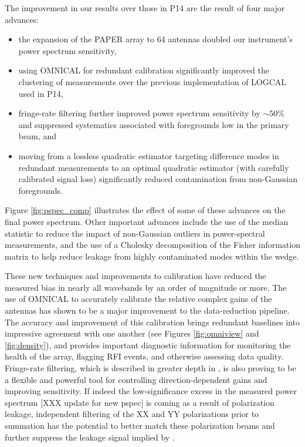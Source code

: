 \documentclass[twocolumn,numberedappendix]{emulateapj} \shorttitle{New Limits on the 21 cm Power Spectrum at $z=8.4$}
\begin{document}
The improvement in our results over those in P14 are the result of four
major advances:
\begin{itemize}
\item the expansion of the PAPER array to 64 antennas doubled our instrument's power spectrum sensitivity,
\item using OMNICAL for redundant calibration significantly improved the clustering of measurements
over the previous implementation of LOGCAL used in P14,
\item fringe-rate filtering further improved power spectrum sensitivity by $\sim$50\% and suppressed
systematics associated with foregrounds low in the primary beam, and
\item moving from a lossless quadratic estimator targeting difference modes
in redundant measurements to an optimal quadratic estimator (with carefully calibrated signal
loss) significantly reduced contamination from non-Gaussian foregrounds.
\end{itemize}
Figure \ref{fig:pspec_comp} illustrates the effect of some of these advances on the final
power spectrum.
Other important advances include the use of the median statistic to reduce the impact
of non-Gaussian outliers in power-spectral measurements, and the use of a Cholesky
decomposition of the Fisher information matrix to help reduce leakage 
from highly contaminated modes within the wedge.

These new techniques and improvements to calibration have reduced the measured
bias in nearly all wavebands by an order of magnitude or more. 
The use of
OMNICAL to accurately calibrate the relative complex gains of the antennas has
shown to be a major improvement to the data-reduction pipeline. The accuracy and improvement of
this calibration brings redundant baselines into impressive agreement with one another
(see Figures \ref{fig:omniview} and \ref{fig:density}),
and provides important diagnostic information for
monitoring the health of the
array, flagging RFI events, and otherwise assessing data quality.
Fringe-rate filtering, which is described in greater depth in \citep{parsons_et_al2015}, is also
proving to be a flexible and powerful tool for controlling direction-dependent gains and
improving sensitivity.  If indeed the low-significance excess in the measured power spectrum
[XXX update for new pspec]
is coming as a result of polarization leakage, independent filtering of the XX and YY polarizations
prior to summation has the potential to better match these polarization beams and further suppress 
the leakage signal implied by \citet{moore_et_al2015}.
\end{document}

